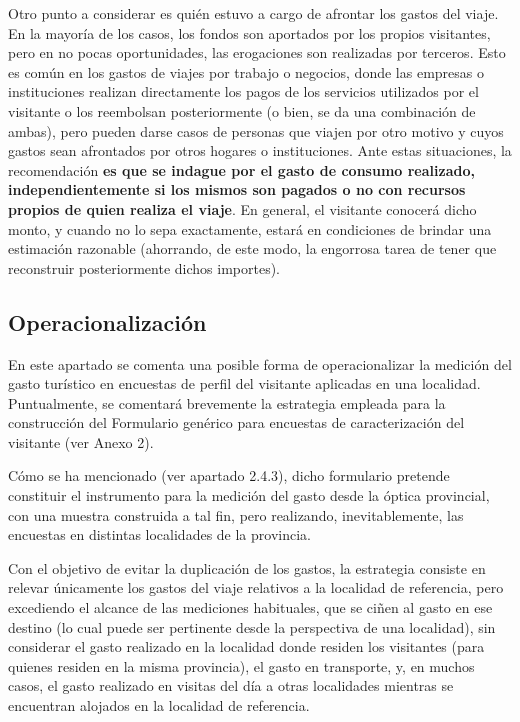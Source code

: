 \documentclass[
]{book}
\begin{document}
Otro punto a considerar es quién estuvo a cargo de afrontar los gastos del viaje. En la mayoría de los casos, los fondos son aportados por los propios visitantes, pero en no pocas oportunidades, las erogaciones son realizadas por terceros. Esto es común en los gastos de viajes por trabajo o negocios, donde las empresas o instituciones realizan directamente los pagos de los servicios utilizados por el visitante o los reembolsan posteriormente (o bien, se da una combinación de ambas), pero pueden darse casos de personas que viajen por otro motivo y cuyos gastos sean afrontados por otros hogares o instituciones. Ante estas situaciones, la recomendación \textbf{es que se indague por el gasto de consumo realizado, independientemente si los mismos son pagados o no con recursos propios de quien realiza el viaje}. En general, el visitante conocerá dicho monto, y cuando no lo sepa exactamente, estará en condiciones de brindar una estimación razonable (ahorrando, de este modo, la engorrosa tarea de tener que reconstruir posteriormente dichos importes).

\hypertarget{operacionalizaciuxf3n}{%
\subsection{Operacionalización}\label{operacionalizaciuxf3n}}

En este apartado se comenta una posible forma de operacionalizar la medición del gasto turístico en encuestas de perfil del visitante aplicadas en una localidad. Puntualmente, se comentará brevemente la estrategia empleada para la construcción del Formulario genérico para encuestas de caracterización del visitante (ver Anexo 2).

Cómo se ha mencionado (ver apartado 2.4.3), dicho formulario pretende constituir el instrumento para la medición del gasto desde la óptica provincial, con una muestra construida a tal fin, pero realizando, inevitablemente, las encuestas en distintas localidades de la provincia.

Con el objetivo de evitar la duplicación de los gastos, la estrategia consiste en relevar únicamente los gastos del viaje relativos a la localidad de referencia, pero excediendo el alcance de las mediciones habituales, que se ciñen al gasto en ese destino (lo cual puede ser pertinente desde la perspectiva de una localidad), sin considerar el gasto realizado en la localidad donde residen los visitantes (para quienes residen en la misma provincia), el gasto en transporte, y, en muchos casos, el gasto realizado en visitas del día a otras localidades mientras se encuentran alojados en la localidad de referencia.
\end{document}
